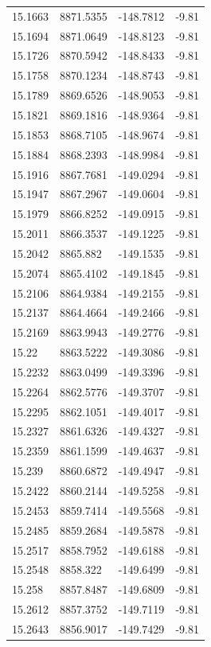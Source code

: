 \begin{table}[H]
\begin{tabular}{llll}
15.1663 & 8871.5355 & -148.7812 & -9.81 \\
15.1694 & 8871.0649 & -148.8123 & -9.81 \\
15.1726 & 8870.5942 & -148.8433 & -9.81 \\
15.1758 & 8870.1234 & -148.8743 & -9.81 \\
15.1789 & 8869.6526 & -148.9053 & -9.81 \\
15.1821 & 8869.1816 & -148.9364 & -9.81 \\
15.1853 & 8868.7105 & -148.9674 & -9.81 \\
15.1884 & 8868.2393 & -148.9984 & -9.81 \\
15.1916 & 8867.7681 & -149.0294 & -9.81 \\
15.1947 & 8867.2967 & -149.0604 & -9.81 \\
15.1979 & 8866.8252 & -149.0915 & -9.81 \\
15.2011 & 8866.3537 & -149.1225 & -9.81 \\
15.2042 & 8865.882 & -149.1535 & -9.81 \\
15.2074 & 8865.4102 & -149.1845 & -9.81 \\
15.2106 & 8864.9384 & -149.2155 & -9.81 \\
15.2137 & 8864.4664 & -149.2466 & -9.81 \\
15.2169 & 8863.9943 & -149.2776 & -9.81 \\
15.22 & 8863.5222 & -149.3086 & -9.81 \\
15.2232 & 8863.0499 & -149.3396 & -9.81 \\
15.2264 & 8862.5776 & -149.3707 & -9.81 \\
15.2295 & 8862.1051 & -149.4017 & -9.81 \\
15.2327 & 8861.6326 & -149.4327 & -9.81 \\
15.2359 & 8861.1599 & -149.4637 & -9.81 \\
15.239 & 8860.6872 & -149.4947 & -9.81 \\
15.2422 & 8860.2144 & -149.5258 & -9.81 \\
15.2453 & 8859.7414 & -149.5568 & -9.81 \\
15.2485 & 8859.2684 & -149.5878 & -9.81 \\
15.2517 & 8858.7952 & -149.6188 & -9.81 \\
15.2548 & 8858.322 & -149.6499 & -9.81 \\
15.258 & 8857.8487 & -149.6809 & -9.81 \\
15.2612 & 8857.3752 & -149.7119 & -9.81 \\
15.2643 & 8856.9017 & -149.7429 & -9.81 \\

\end{tabular}
\end{table}
